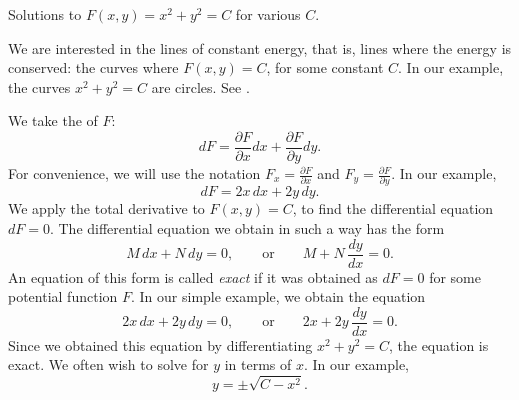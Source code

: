 \begin{mywrapfig}[16]{3.25in}
\capstart
{}
\caption{Solutions to $F(x,y) = x^2+y^2 = C$ for various
$C$.\label{exact:circlesfig}}
\end{mywrapfig}
We are interested in the lines of constant energy, that is, lines where
the energy is conserved:  the curves where $F(x,y) = C$,
for some constant $C$.  In
our example, the curves $x^2+y^2=C$ are circles.  See
.

We take the
\emph{} of
$F$:
\begin{equation*}
dF = \frac{\partial F}{\partial x} dx + \frac{\partial F}{\partial y} dy .
\end{equation*}
For convenience,
we will use the notation
$F_x = \frac{\partial F}{\partial x}$ and
$F_y = \frac{\partial F}{\partial y}$.
In our example,
\begin{equation*}
dF = 2x \, dx + 2y \, dy .
\end{equation*}
We apply the total derivative to $F(x,y) = C$, to find
the differential equation $dF = 0$.  The differential equation we obtain in such a way
has the form
\begin{equation*}
M \, dx + N \, dy = 0, \qquad
\text{or} \qquad
M + N \, \frac{dy}{dx} = 0 .
\end{equation*}
An equation of this form
is called \emph{exact} if it was obtained as $dF = 0$ for some potential
function $F$.
In our simple example, we obtain the equation
\begin{equation*}
2x \, dx + 2y \, dy = 0, \qquad
\text{or} \qquad
2x + 2y \, \frac{dy}{dx} = 0 .
\end{equation*}
Since we obtained this equation by differentiating $x^2+y^2=C$, 
the equation is exact.
We often wish to solve for $y$ in terms of $x$.  In our example,
\begin{equation*}
y = \pm \sqrt{C-x^2} .
\end{equation*}

